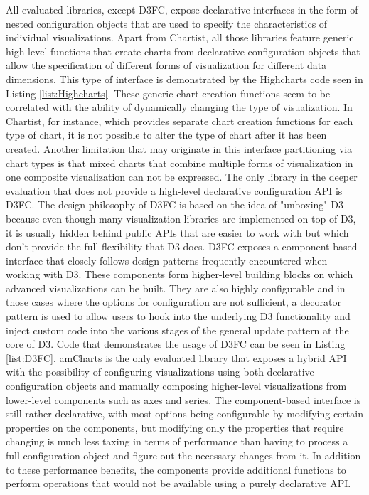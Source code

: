 All evaluated libraries, except D3FC, expose declarative interfaces in the form of nested configuration objects that are used to specify the characteristics of individual visualizations. Apart from Chartist, all those libraries feature generic high-level functions that create charts from declarative configuration objects that allow the specification of different forms of visualization for different data dimensions. This type of interface is demonstrated by the Highcharts code seen in Listing \ref{list:Highcharts}. These generic chart creation functions seem to be correlated with the ability of dynamically changing the type of visualization. In Chartist, for instance, which provides separate chart creation functions for each type of chart, it is not possible to alter the type of chart after it has been created. Another limitation that may originate in this interface partitioning via chart types is that mixed charts that combine multiple forms of visualization in one composite visualization can not be expressed. The only library in the deeper evaluation that does not provide a high-level declarative configuration API is D3FC. The design philosophy of D3FC is based on the idea of "unboxing" D3 because even though many visualization libraries are implemented on top of D3, it is usually hidden behind public APIs that are easier to work with but which don't provide the full flexibility that D3 does. D3FC exposes a component-based interface that closely follows design patterns frequently encountered when working with D3. These components form higher-level building blocks on which advanced visualizations can be built. They are also highly configurable and in those cases where the options for configuration are not sufficient, a decorator pattern is used to allow users to hook into the underlying D3 functionality and inject custom code into the various stages of the general update pattern at the core of D3. Code that demonstrates the usage of D3FC can be seen in Listing \ref{list:D3FC}. amCharts is the only evaluated library that exposes a hybrid API with the possibility of configuring visualizations using both declarative configuration objects and manually composing higher-level visualizations from lower-level components such as axes and series. The component-based interface is still rather declarative, with most options being configurable by modifying certain properties on the components, but modifying only the properties that require changing is much less taxing in terms of performance than having to process a full configuration object and figure out the necessary changes from it. In addition to these performance benefits, the components provide additional functions to perform operations that would not be available using a purely declarative API.

